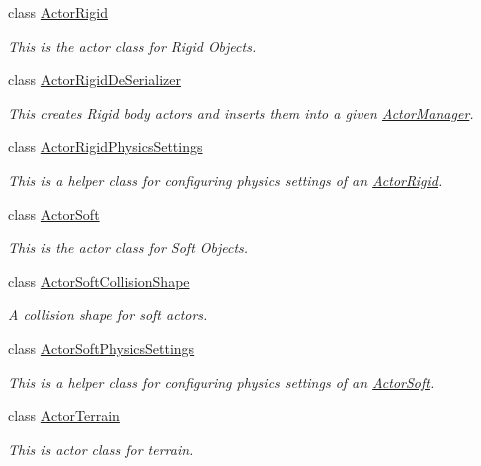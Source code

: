\begin{DoxyCompactItemize}
class \hyperlink{classphys_1_1ActorRigid}{ActorRigid}
\begin{DoxyCompactList}\small\item\em This is the actor class for Rigid Objects. \item\end{DoxyCompactList}\item 
class \hyperlink{classphys_1_1ActorRigidDeSerializer}{ActorRigidDeSerializer}
\begin{DoxyCompactList}\small\item\em This creates Rigid body actors and inserts them into a given \hyperlink{classphys_1_1ActorManager}{ActorManager}. \item\end{DoxyCompactList}\item 
class \hyperlink{classphys_1_1ActorRigidPhysicsSettings}{ActorRigidPhysicsSettings}
\begin{DoxyCompactList}\small\item\em This is a helper class for configuring physics settings of an \hyperlink{classphys_1_1ActorRigid}{ActorRigid}. \item\end{DoxyCompactList}\item 
class \hyperlink{classphys_1_1ActorSoft}{ActorSoft}
\begin{DoxyCompactList}\small\item\em This is the actor class for Soft Objects. \item\end{DoxyCompactList}\item 
class \hyperlink{classphys_1_1ActorSoftCollisionShape}{ActorSoftCollisionShape}
\begin{DoxyCompactList}\small\item\em A collision shape for soft actors. \item\end{DoxyCompactList}\item 
class \hyperlink{classphys_1_1ActorSoftPhysicsSettings}{ActorSoftPhysicsSettings}
\begin{DoxyCompactList}\small\item\em This is a helper class for configuring physics settings of an \hyperlink{classphys_1_1ActorSoft}{ActorSoft}. \item\end{DoxyCompactList}\item 
class \hyperlink{classphys_1_1ActorTerrain}{ActorTerrain}
\begin{DoxyCompactList}\small\item\em This is actor class for terrain. \item\end{DoxyCompactList}\item 

\end{DoxyCompactItemize}
